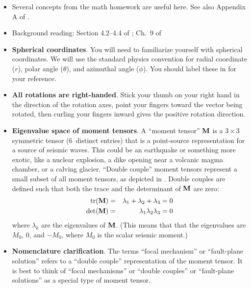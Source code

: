 \documentclass[11pt,titlepage,fleqn]{article}
\begin{document}
\begin{itemize}
\item Several concepts from the math homework are useful here. See also Appendix A of \citet{SteinWysession}.

\item Background reading: Section 4.2--4.4 of \citet{SteinWysession}; Ch.~9 of \citet{ShearerE2}

\item {\bf Spherical coordinates}. You will need to familiarize yourself with spherical coordinates. We will use the standard physics convention for radial coordinate ($r$), polar angle ($\theta$), and azimuthal angle ($\phi$). You should label these in  for your reference.

\item {\bf All rotations are right-handed}. Stick your thumb on your right hand in the direction of the rotation axes, point your fingers toward the vector being rotated, then curling your fingers inward gives the positive rotation direction.

\item {\bf Eigenvalue space of moment tensors}. A ``moment tensor'' $\mbox{${\bf M}$}$ is a $3 \times 3$ symmetric tensor (6~distinct entries) that is a point-source representation for a source of seismic waves. This could be an earthquake or something more exotic, like a nuclear explosion, a dike opening near a volcanic magma chamber, or a calving glacier. ``Double couple'' moment tensors represent a small subset of all moment tensors, as depicted in . Double couples are defined such that both the trace and the determinant of $\mbox{${\bf M}$}$ are zero:
%
\begin{eqnarray*}
{\rm tr}(\mbox{${\bf M}$}) &=& \lambda_1 + \lambda_2 + \lambda_3 = 0
\\
\det(\mbox{${\bf M}$}) &=& \lambda_1 \lambda_2 \lambda_3 = 0
\end{eqnarray*}
%
where $\lambda_k$ are the eigenvalues of $\mbox{${\bf M}$}$. (This means that that the eigenvalues are $M_0$, 0, and $-M_0$, where $M_0$ is the scalar seismic moment.)

\item {\bf Nomenclature clarification}. 
The terms ``focal mechanism'' or ``fault-plane solution'' refers to a ``double couple'' representation of the moment tensor. It is best to think of ``focal mechanisms'' or ``double couples'' or ``fault-plane solutions'' as a special type of moment tensor.

\end{itemize}
\end{document}
